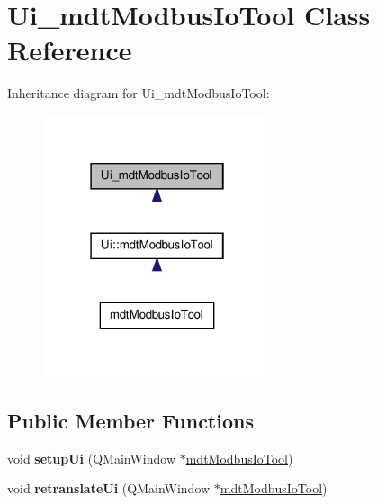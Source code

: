 \hypertarget{class_ui__mdt_modbus_io_tool}{
\section{Ui\_\-mdtModbusIoTool Class Reference}
\label{class_ui__mdt_modbus_io_tool}
}


Inheritance diagram for Ui\_\-mdtModbusIoTool:\nopagebreak
\begin{figure}[H]
\begin{center}
\leavevmode
\includegraphics[width=190pt]{class_ui__mdt_modbus_io_tool__inherit__graph}
\end{center}
\end{figure}
\subsection*{Public Member Functions}
\begin{DoxyCompactItemize}
\item 
\hypertarget{class_ui__mdt_modbus_io_tool_aeceaeaccbc3c38603c0fc35bd5fb2815}{
void {\bfseries setupUi} (QMainWindow $\ast$\hyperlink{classmdt_modbus_io_tool}{mdtModbusIoTool})}
\label{class_ui__mdt_modbus_io_tool_aeceaeaccbc3c38603c0fc35bd5fb2815}

\item 
\hypertarget{class_ui__mdt_modbus_io_tool_a5344c19fa7f91ed18bd9940dab02746b}{
void {\bfseries retranslateUi} (QMainWindow $\ast$\hyperlink{classmdt_modbus_io_tool}{mdtModbusIoTool})}
\label{class_ui__mdt_modbus_io_tool_a5344c19fa7f91ed18bd9940dab02746b}

\end{DoxyCompactItemize}

